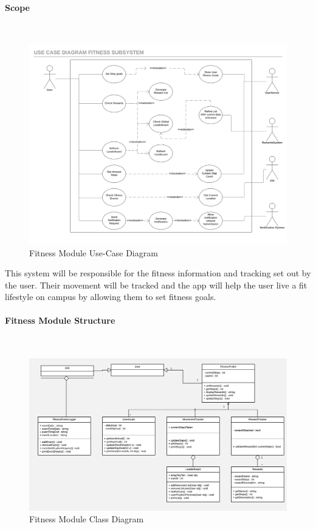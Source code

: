 \documentclass{article}
\begin{document}
			\paragraph{Scope}\mbox{} \\
				\begin{figure}[h]
					\includegraphics[width=\textwidth]{./Images/fitness_use_case.png} 
					\caption{Fitness Module Use-Case Diagram}
				\end{figure}
				
			{This system will be responsible for the fitness information and tracking set out by the user. Their movement will be tracked and the app will help the user live a fit lifestyle on campus by allowing them to set fitness goals.}
			
			\paragraph{Fitness Module Structure} \mbox{} \\
			\begin{figure}[h]
				\includegraphics[width=\textwidth]{./Images/Fitness_System_Class_Diagram_-_Fixed_Dependencies.png} 
				\caption{Fitness Module Class Diagram}
			\end{figure}
			
\end{document}
